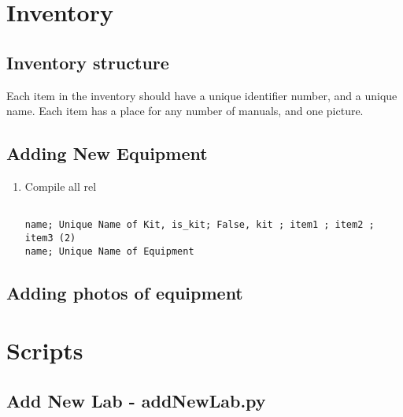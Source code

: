 \documentclass[justified]{book}
\begin{document}
\section{Inventory}

\subsection{Inventory structure}

Each item in the inventory should have a unique identifier number, and a unique name. Each item has a place for any number of manuals, and one picture. 


\subsection{Adding New Equipment}



\begin{enumerate}
\item Compile all rel

	\begin{lstlisting}[backgroundcolor = \color{light-gray}, 	caption = The file info.csv needs to be in this form.
	               language = csv, xleftmargin = -2cm, xrightmargin = -2cm,
                   framexleftmargin = 1em
                   ]
                   
name; Unique Name of Kit, is_kit; False, kit ; item1 ; item2 ; item3 (2)
name; Unique Name of Equipment

\end{lstlisting}

\end{enumerate}

\subsection{Adding photos of equipment}




\section{Scripts}

\subsection{Add New Lab - addNewLab.py}





\end{document}
